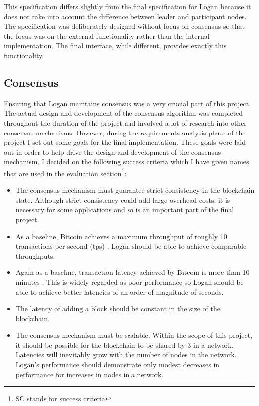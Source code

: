 \documentclass[12pt,a4paper,twoside,openright]{report}
\begin{document}
	This specification differs slightly from the final specification for Logan because it does not take into account the difference between leader and participant nodes.
	The specification was deliberately designed without focus on consensus so that the focus was on the external functionality rather than the internal implementation. 
	The final interface, while different, provides exactly this functionality.

	\subsection{Consensus}\label{Consensus Requirements}
	Ensuring that Logan maintains consensus was a very crucial part of this project. 
	The actual design and development of the consensus algorithm was completed throughout the duration of the project and involved a lot of research into other consensus mechanisms.
	However, during the requirements analysis phase of the project I set out some goals for the final implementation.
	These goals were laid out in order to help drive the design and development of the consensus mechanism. 
	I decided on the following success criteria which I have given names that are used in the evaluation section\footnote{SC stands for success criteria}:
	\begin{itemize}
		\setlength{\itemindent}{2em}
		\item[\textbf{SC\_1}]The consensus mechanism must guarantee strict consistency in the blockchain state. 
		Although strict consistency could add large overhead costs, it is necessary for some applications and so is an important part of the final project.
		\item[\textbf{SC\_2}] As a baseline, Bitcoin achieves a maximum throughput of roughly 10 transactions per second (tps) \cite{ScalingBitcoin}.
		Logan should be able to achieve comparable throughputs.
		\item[\textbf{SC\_3}] Again as a baseline, transaction latency achieved by Bitcoin is more than 10 minutes \cite{ScalingBitcoin}.
		This is widely regarded as poor performance so Logan should be able to achieve better latencies of an order of magnitude of seconds.
		\item[\textbf{SC\_4}] The latency of adding a block should be constant in the size of the blockchain.
		\item[\textbf{SC\_5}] The consensus mechanism must be scalable. 
		Within the scope of this project, it should be possible for the blockchain to be shared by 3 in a network. 
		Latencies will inevitably grow with the number of nodes in the network.
		Logan's performance should demonstrate only modest decreases in performance for increases in nodes in a network.
	\end{itemize}
\end{document}
